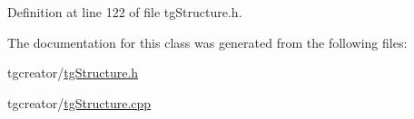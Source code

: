 Definition at line 122 of file tg\-Structure.\-h.



The documentation for this class was generated from the following files\-:\begin{DoxyCompactItemize}
\item 
tgcreator/\hyperlink{tg_structure_8h}{tg\-Structure.\-h}\item 
tgcreator/\hyperlink{tg_structure_8cpp}{tg\-Structure.\-cpp}\end{DoxyCompactItemize}

